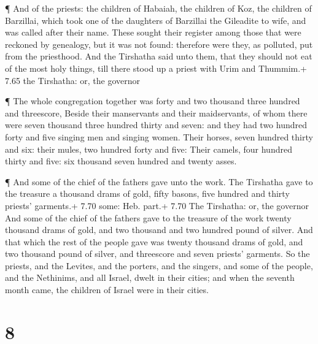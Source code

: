  ¶ And of the priests: the children of Habaiah, the
children of Koz, the children of Barzillai, which took one of the
daughters of Barzillai the Gileadite to wife, and was called after their
name.  These sought their register among those that were
reckoned by genealogy, but it was not found: therefore were they, as
polluted, put from the priesthood.  And the Tirshatha said
unto them, that they should not eat of the most holy things, till there
stood up a priest with Urim and Thummim.+ 7.65 the Tirshatha: or, the
governor

 ¶ The whole congregation together was forty and two
thousand three hundred and threescore,  Beside their
manservants and their maidservants, of whom there were seven thousand
three hundred thirty and seven: and they had two hundred forty and five
singing men and singing women.  Their horses, seven hundred
thirty and six: their mules, two hundred forty and five: 
Their camels, four hundred thirty and five: six thousand seven hundred
and twenty asses.

 ¶ And some of the chief of the fathers gave unto the work.
The Tirshatha gave to the treasure a thousand drams of gold, fifty
basons, five hundred and thirty priests' garments.+ 7.70 some: Heb.
part.+ 7.70 The Tirshatha: or, the governor  And some of
the chief of the fathers gave to the treasure of the work twenty
thousand drams of gold, and two thousand and two hundred pound of
silver.  And that which the rest of the people gave was
twenty thousand drams of gold, and two thousand pound of silver, and
threescore and seven priests' garments.  So the priests,
and the Levites, and the porters, and the singers, and some of the
people, and the Nethinims, and all Israel, dwelt in their cities; and
when the seventh month came, the children of Israel were in their
cities.

\hypertarget{section-7}{%
\section{8}\label{section-7}}

